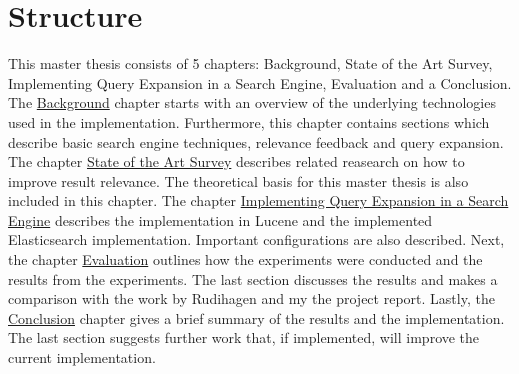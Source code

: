 \section{Structure}
This master thesis consists of 5 chapters: Background, State of the Art Survey, Implementing Query Expansion in a Search Engine, Evaluation and a Conclusion.
The \hyperref[ch:background]{Background} chapter starts with an overview of the underlying technologies used in the implementation.
Furthermore, this chapter contains sections which describe basic search engine techniques, relevance feedback and query expansion.
The chapter \hyperref[ch:related-work]{State of the Art Survey} describes related reasearch on how to improve result relevance.
The theoretical basis for this master thesis is also included in this chapter.
The chapter \hyperref[ch:approach]{Implementing Query Expansion in a Search Engine} describes the implementation in Lucene and the implemented Elasticsearch implementation.
Important configurations are also described.
Next, the chapter \hyperref[ch:evaluation]{Evaluation} outlines how the experiments were conducted and the results from the experiments.
The last section discusses the results and makes a comparison with the work by Rudihagen and my the project report.
Lastly, the \hyperref[ch:conclusion]{Conclusion} chapter gives a brief summary of the results and the implementation.
The last section suggests further work that, if implemented, will improve the current implementation.
